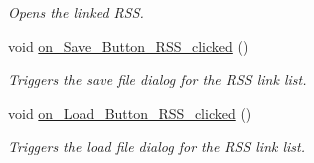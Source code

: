 \begin{DoxyCompactItemize}
\begin{DoxyCompactList}\small\item\em Opens the linked R\+S\+S. \end{DoxyCompactList}\item 
void \hyperlink{class_t_k_r_t_a_p_afbf6f2c24b041c0834c72d96452638bd}{on\+\_\+\+Save\+\_\+\+Button\+\_\+\+R\+S\+S\+\_\+clicked} ()
\begin{DoxyCompactList}\small\item\em Triggers the save file dialog for the R\+S\+S link list. \end{DoxyCompactList}\item 
void \hyperlink{class_t_k_r_t_a_p_ac99a293ac859f4b8e9f3b539c0fe1889}{on\+\_\+\+Load\+\_\+\+Button\+\_\+\+R\+S\+S\+\_\+clicked} ()
\begin{DoxyCompactList}\small\item\em Triggers the load file dialog for the R\+S\+S link list. \end{DoxyCompactList}\end{DoxyCompactItemize}
